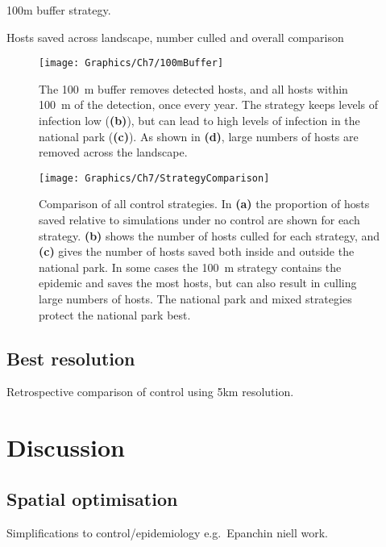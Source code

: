100m buffer strategy.

Hosts saved across landscape, number culled and overall comparison

\begin{figure}
    \begin{center}
        \texttt{[image: Graphics/Ch7/100mBuffer]}
        \caption[\SI{100}{\meter} buffer zone strategy]{The \SI{100}{\meter} buffer removes detected hosts, and all hosts within \SI{100}{\meter} of the detection, once every year. The strategy keeps levels of infection low (\textbf{(b)}), but can lead to high levels of infection in the national park (\textbf{(c)}). As shown in \textbf{(d)}, large numbers of hosts are removed across the landscape.}
    \end{center}
\end{figure}

\begin{figure}
    \begin{center}
        \texttt{[image: Graphics/Ch7/StrategyComparison]}
        \caption[Comparison of all control strategies]{Comparison of all control strategies. In \textbf{(a)} the proportion of hosts saved relative to simulations under no control are shown for each strategy. \textbf{(b)} shows the number of hosts culled for each strategy, and \textbf{(c)} gives the number of hosts saved both inside and outside the national park. In some cases the \SI{100}{\meter} strategy contains the epidemic and saves the most hosts, but can also result in culling large numbers of hosts. The national park and mixed strategies protect the national park best.}
    \end{center}
\end{figure}

\subsection{Best resolution}

Retrospective comparison of control using 5km resolution.

\section{Discussion}

\subsection{Spatial optimisation}

Simplifications to control/epidemiology e.g.\ Epanchin niell work.

